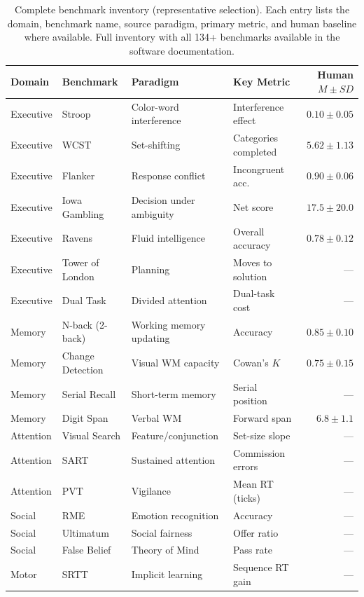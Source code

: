 \documentclass[11pt,letterpaper]{article}
\begin{document}
\begin{table}[p]
\centering
\caption{Complete benchmark inventory (representative selection). Each entry lists the domain, benchmark name, source paradigm, primary metric, and human baseline where available. Full inventory with all 134+ benchmarks available in the software documentation.}
\label{tab:inventory}
\small
\begin{tabular}{@{}llllr@{}}
\toprule
\textbf{Domain} & \textbf{Benchmark} & \textbf{Paradigm} & \textbf{Key Metric} & \textbf{Human $M \pm SD$} \\
\midrule
Executive & Stroop & Color-word interference & Interference effect & $0.10 \pm 0.05$ \\
Executive & WCST & Set-shifting & Categories completed & $5.62 \pm 1.13$ \\
Executive & Flanker & Response conflict & Incongruent acc. & $0.90 \pm 0.06$ \\
Executive & Iowa Gambling & Decision under ambiguity & Net score & $17.5 \pm 20.0$ \\
Executive & Ravens & Fluid intelligence & Overall accuracy & $0.78 \pm 0.12$ \\
Executive & Tower of London & Planning & Moves to solution & --- \\
Executive & Dual Task & Divided attention & Dual-task cost & --- \\
\midrule
Memory & N-back (2-back) & Working memory updating & Accuracy & $0.85 \pm 0.10$ \\
Memory & Change Detection & Visual WM capacity & Cowan's $K$ & $0.75 \pm 0.15$ \\
Memory & Serial Recall & Short-term memory & Serial position & --- \\
Memory & Digit Span & Verbal WM & Forward span & $6.8 \pm 1.1$ \\
\midrule
Attention & Visual Search & Feature/conjunction & Set-size slope & --- \\
Attention & SART & Sustained attention & Commission errors & --- \\
Attention & PVT & Vigilance & Mean RT (ticks) & --- \\
\midrule
Social & RME & Emotion recognition & Accuracy & --- \\
Social & Ultimatum & Social fairness & Offer ratio & --- \\
Social & False Belief & Theory of Mind & Pass rate & --- \\
\midrule
Motor & SRTT & Implicit learning & Sequence RT gain & --- \\

\end{tabular}
\end{table}
\end{document}
